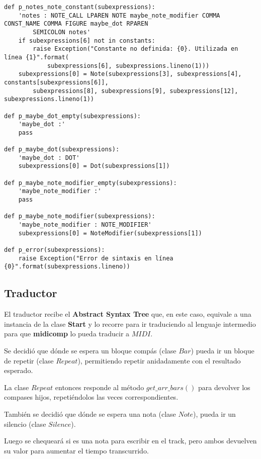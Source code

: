 \begin{verbatim}
def p_notes_note_constant(subexpressions):
    'notes : NOTE_CALL LPAREN NOTE maybe_note_modifier COMMA CONST_NAME COMMA FIGURE maybe_dot RPAREN
        SEMICOLON notes'
    if subexpressions[6] not in constants:
        raise Exception("Constante no definida: {0}. Utilizada en línea {1}".format(
            subexpressions[6], subexpressions.lineno(1)))
    subexpressions[0] = Note(subexpressions[3], subexpressions[4], constants[subexpressions[6]],
        subexpressions[8], subexpressions[9], subexpressions[12], subexpressions.lineno(1))

def p_maybe_dot_empty(subexpressions):
    'maybe_dot :'
    pass

def p_maybe_dot(subexpressions):
    'maybe_dot : DOT'
    subexpressions[0] = Dot(subexpressions[1])

def p_maybe_note_modifier_empty(subexpressions):
    'maybe_note_modifier :'
    pass

def p_maybe_note_modifier(subexpressions):
    'maybe_note_modifier : NOTE_MODIFIER'
    subexpressions[0] = NoteModifier(subexpressions[1])

def p_error(subexpressions):
    raise Exception("Error de sintaxis en línea {0}".format(subexpressions.lineno))

\end{verbatim}

\newpage

\subsection{Traductor}

El traductor recibe el \textbf{Abstract Syntax Tree} que, en este caso, equivale a una instancia de la clase \textbf{Start} y lo recorre para ir traduciendo al lenguaje intermedio para que \textbf{midicomp} lo pueda traducir a $MIDI$.

Se decidió que dónde se espera un bloque compás (clase $Bar$) pueda ir un bloque de repetir (clase $Repeat$), permitiendo repetir anidadamente con el resultado esperado.

La clase $Repeat$ entonces responde al método $get\_arr\_bars()$ para devolver los compases hijos, repetiéndolos las veces correspondientes.

También se decidió que dónde se espera una nota (clase $Note$), pueda ir un silencio (clase $Silence$).

Luego se chequeará si es una nota para escribir en el track, pero ambos devuelven su valor para aumentar el tiempo transcurrido.

